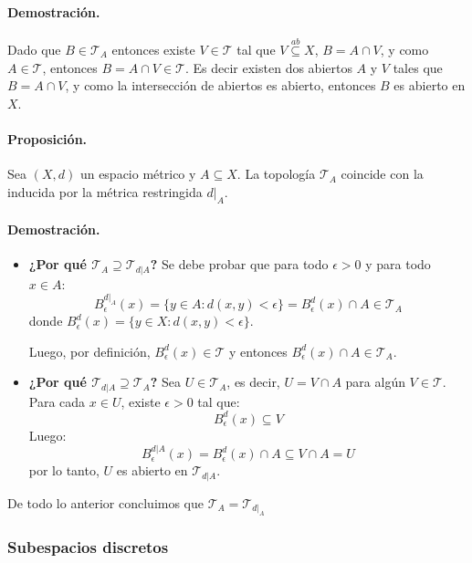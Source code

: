 \paragraph{\textbf{Demostración.}}
Dado que $B \in  \mathcal T_A$ entonces existe $V \in \mathcal T$ tal que $V \overset{ab} \subseteq X$, $B = A \cap V$, y como $A \in \mathcal T$, entonces $B = A \cap V \in \mathcal T$. Es decir existen dos abiertos $A$ y $V$ tales que $B = A \cap V$, y como la intersección de abiertos es abierto, entonces $B$ es abierto en $X$.

\paragraph{\textbf{Proposición.}}
Sea $(X,d)$ un espacio métrico y $A\subseteq X$. La topología $\mathcal T_{A}$
coincide con la inducida por la métrica restringida $d|_{A}$.

\paragraph{\textbf{Demostración.}}

\begin{itemize}
  \item \textbf{¿Por qué $\mathcal T_A \supseteq \mathcal T_{d|A}$?}  
  Se debe probar que para todo $\epsilon>0$ y para todo $x\in A$:
  $$
  B_\epsilon^{d|_A}(x) = \{ y \in A : d(x,y) < \epsilon \} = B_{\epsilon}^d(x) \cap A \in \mathcal T_A
  $$
  donde $B_\epsilon^d(x) = \{ y \in X : d(x,y) < \epsilon \}$.
  
  Luego, por definición, $B_\epsilon^d(x) \in \mathcal T$ y entonces $B_\epsilon^d(x) \cap A \in \mathcal T_A$.

  \item \textbf{¿Por qué $\mathcal T_{d|A} \supseteq \mathcal T_A$?}  
  Sea $U \in \mathcal T_A$, es decir, $U = V \cap A$ para algún $V \in \mathcal T$.  
  Para cada $x \in U$, existe $\epsilon > 0$ tal que:
  $$
  B_\epsilon^d(x) \subseteq V
  $$
  Luego:
  $$
  B_\epsilon^{d|A}(x) = B_\epsilon^d(x) \cap A \subseteq V \cap A = U
  $$
  por lo tanto, $U$ es abierto en $\mathcal T_{d|A}$.
\end{itemize}

De todo lo anterior concluimos que $\mathcal T_A = \mathcal T_{d|_A}$

\subsubsection{Subespacios discretos}

